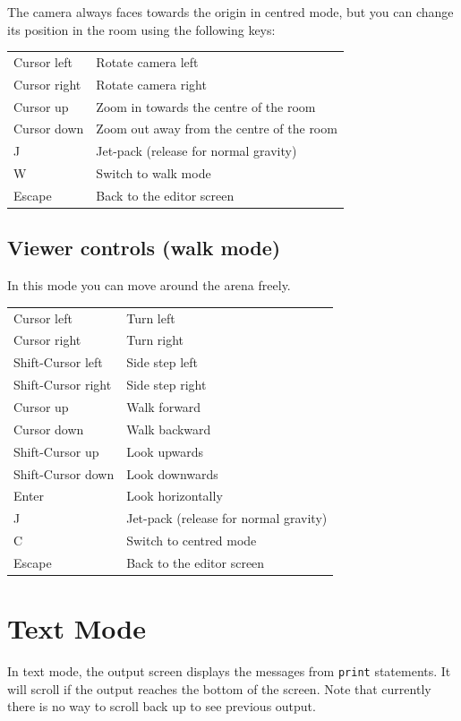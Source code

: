 \documentclass[12pt,a4paper,twoside]{article}
\renewcommand{\_}{\texttt{\symbol{95}}}
\begin{document}
The camera always faces towards the origin in centred mode,
but you can change its position in the room using the following keys:

\begin{tabular}{ll}
Cursor left  & Rotate camera left\\
Cursor right & Rotate camera right\\
Cursor up    & Zoom in towards the centre of the room\\
Cursor down  & Zoom out away from the centre of the room\\
J            & Jet-pack (release for normal gravity)\\
W            & Switch to walk mode\\
Escape       & Back to the editor screen\\
\end{tabular}

\subsection{Viewer controls (walk mode)}

In this mode you can move around the arena freely.

\begin{tabular}{ll}
Cursor left  & Turn left\\
Cursor right & Turn right\\
Shift-Cursor left  & Side step left\\
Shift-Cursor right & Side step right\\
Cursor up    & Walk forward\\
Cursor down  & Walk backward\\
Shift-Cursor up & Look upwards\\
Shift-Cursor down & Look downwards\\
Enter        & Look horizontally\\
J            & Jet-pack (release for normal gravity)\\
C            & Switch to centred mode\\
Escape       & Back to the editor screen\\
\end{tabular}


\section{Text Mode} \label{sec:text-mode}

In text mode, the output screen displays the messages from \verb^print^
statements. It will scroll if the output reaches the bottom of the screen.
Note that currently there is no way to scroll back up to see previous output.
\end{document}
